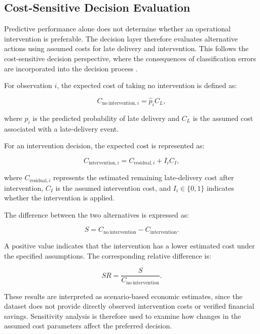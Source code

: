 \documentclass[10pt,a4paper]{article}
\begin{document}
\subsection{Cost-Sensitive Decision Evaluation}

Predictive performance alone does not determine whether an operational
intervention is preferable. The decision layer therefore evaluates
alternative actions using assumed costs for late delivery and
intervention. This follows the cost-sensitive decision perspective,
where the consequences of classification errors are incorporated into
the decision process \cite{elkan2001foundations}.

For observation $i$, the expected cost of taking no intervention is
defined as:

\begin{equation}
C_{\mathrm{no\ intervention},i}
=
\hat{p}_i C_L,
\label{eq:baseline_cost}
\end{equation}

where $\hat{p}_i$ is the predicted probability of late delivery and
$C_L$ is the assumed cost associated with a late-delivery event.

For an intervention decision, the expected cost is represented as:

\begin{equation}
C_{\mathrm{intervention},i}
=
C_{\mathrm{residual},i}
+
I_i C_I,
\label{eq:decision_cost}
\end{equation}

where $C_{\mathrm{residual},i}$ represents the estimated remaining
late-delivery cost after intervention, $C_I$ is the assumed intervention
cost, and $I_i\in\{0,1\}$ indicates whether the intervention is applied.

The difference between the two alternatives is expressed as:

\begin{equation}
S =
C_{\mathrm{no\ intervention}}
-
C_{\mathrm{intervention}}.
\label{eq:saving}
\end{equation}

A positive value indicates that the intervention has a lower estimated
cost under the specified assumptions. The corresponding relative
difference is:

\begin{equation}
SR =
\frac{S}{C_{\mathrm{no\ intervention}}}.
\end{equation}

These results are interpreted as scenario-based economic estimates,
since the dataset does not provide directly observed intervention
costs or verified financial savings. Sensitivity analysis is therefore
used to examine how changes in the assumed cost parameters affect the
preferred decision.
\end{document}
